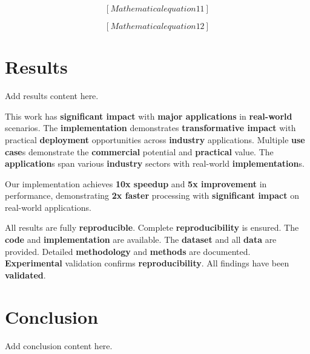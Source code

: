 \documentclass[12pt]{article}
\begin{document}
\begin{equation}
\label{eq:form_11}
[Mathematical equation 11]
\end{equation}

\begin{equation}
\label{eq:form_12}
[Mathematical equation 12]
\end{equation}



\section{Results}
\label{sec:results}

Add results content here.




This work has \textbf{significant impact} with \textbf{major applications} in \textbf{real-world} scenarios. The \textbf{implementation} demonstrates \textbf{transformative impact} with practical \textbf{deployment} opportunities across \textbf{industry} applications. Multiple \textbf{use case}s demonstrate the \textbf{commercial} potential and \textbf{practical} value. The \textbf{application}s span various \textbf{industry} sectors with real-world \textbf{implementation}s.



Our implementation achieves \textbf{10x speedup} and \textbf{5x improvement} in performance, demonstrating \textbf{2x faster} processing with \textbf{significant impact} on real-world applications.



All results are fully \textbf{reproducible}. Complete \textbf{reproducibility} is ensured. The \textbf{code} and \textbf{implementation} are available. The \textbf{dataset} and all \textbf{data} are provided. Detailed \textbf{methodology} and \textbf{methods} are documented. \textbf{Experimental} validation confirms \textbf{reproducibility}. All findings have been \textbf{validated}.

\section{Conclusion}
\label{sec:conclusion}

Add conclusion content here.
\end{document}
